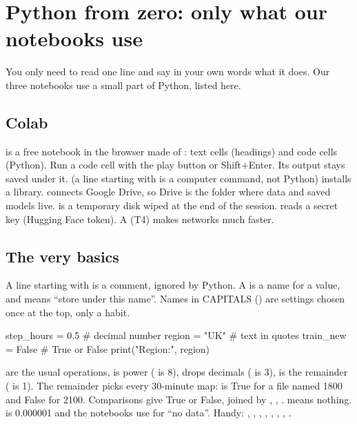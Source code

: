 
\section{Python from zero: only what our notebooks use}\label{ch:python}
You only need to read one line and say in your own words what it does. Our three notebooks use a small part of Python, listed here.

\subsection{Colab}\label{py:colab}
 is a free notebook in the browser made of : text cells (headings) and code cells (Python). Run a code cell with the play button or Shift+Enter. Its output stays saved under it.  (a line starting with \cd{!} is a computer command, not Python) installs a library.  connects Google Drive, so Drive is the folder  where data and saved models live.  is a temporary disk wiped at the end of the session.  reads a secret key (Hugging Face token). A  (T4) makes networks much faster.

\subsection{The very basics}\label{py:basics}
A line starting with \cd{\#} is a comment, ignored by Python. A  is a name for a value, and \cd{=} means ``store under this name''. Names in CAPITALS () are settings chosen once at the top, only a habit.
\begin{pycode}
step_hours = 0.5       # decimal number
region = "UK"          # text in quotes
train_new = False      # True or False
print("Region:", region)
\end{pycode}
\cd{+ - * /} are the usual operations, \cd{**} is power ( is 8), \cd{//} drops decimals ( is 3), \cd{\%} is the remainder ( is 1). The remainder picks every 30-minute map:  is True for a file named 1800 and False for 2100. Comparisons \cd{== != < > <= >=} give True or False, joined by , , .  means nothing.  is 0.000001 and the notebooks use  for ``no data''. Handy: , , , , , , , .

